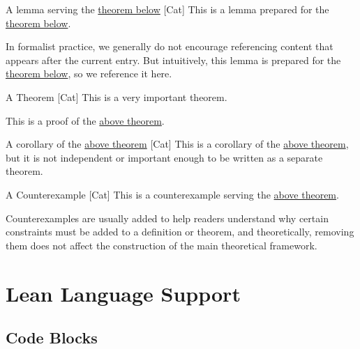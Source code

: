 \documentclass[UTF8]{ctexart}
\begin{document}
        \begin{lma}
            [TheLemma]
            {A lemma serving the \hyperref[thm:TheTheorem]{theorem below}}
            [Cat]
            This is a lemma prepared for the \hyperref[thm:TheTheorem]{theorem below}.
            
            In formalist practice, we generally do not encourage referencing content that appears after the current entry. But intuitively, this lemma is prepared for the \hyperref[thm:TheTheorem]{theorem below}, so we reference it here.
        \end{lma}
        
        \begin{thm}
            [TheTheorem]
            {A Theorem}
            [Cat]
            This is a very important theorem.
        \end{thm}
            
        \begin{prf}
            This is a proof of the \hyperref[thm:TheTheorem]{above theorem}.
        \end{prf}
        
        \begin{crl}
            [TheCorollary]
            {A corollary of the \hyperref[thm:TheTheorem]{above theorem}}
            [Cat]
            This is a corollary of the \hyperref[thm:TheTheorem]{above theorem}, but it is not independent or important enough to be written as a separate theorem.
        \end{crl}
        
        \begin{cxmp}
            [TheCounterExample]
            {A Counterexample}
            [Cat]
            This is a counterexample serving the \hyperref[thm:TheTheorem]{above theorem}.
            
            Counterexamples are usually added to help readers understand why certain constraints must be added to a definition or theorem, and theoretically, removing them does not affect the construction of the main theoretical framework.
        \end{cxmp}

    \section{Lean Language Support}

        \subsection{Code Blocks}
        
\end{document}
